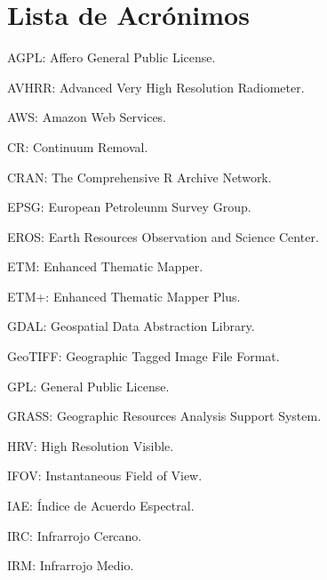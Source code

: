 


\chapter*{Lista de Acrónimos}

AGPL: Affero General Public License.

AVHRR: Advanced Very High Resolution Radiometer.

AWS: Amazon Web Services.

CR: Continuum Removal.

CRAN: The Comprehensive R Archive Network.

EPSG: European Petroleunm Survey Group.

EROS: Earth Resources Observation and Science Center.

ETM: Enhanced Thematic Mapper.

ETM+: Enhanced Thematic Mapper Plus.

GDAL: Geospatial Data Abstraction Library.

GeoTIFF: Geographic Tagged Image File Format.

GPL: General Public License.

GRASS: Geographic Resources Analysis Support System.

HRV: High Resolution Visible.

IFOV: Instantaneous Field of View.

IAE: Índice de Acuerdo Espectral.

IRC: Infrarrojo Cercano.

IRM: Infrarrojo Medio.

